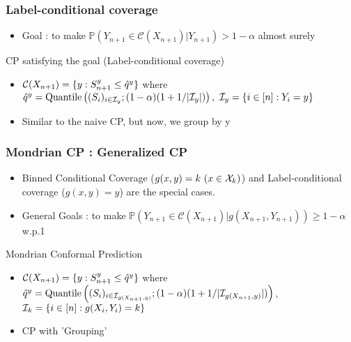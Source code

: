 \documentclass[compress]{beamer}
\begin{document}
\begin{frame}\frametitle{Label-conditional coverage}
	\begin{itemize}
		\item Goal : to make $\mathbb{P}(Y_{n+1}\in \mathcal{C}(X_{n+1})|Y_{n+1}) > 1-\alpha$ almost surely
	\end{itemize}
	\begin{alertblock}{CP satisfying the goal (Label-conditional coverage)}
		\begin{itemize}
			\item $\mathcal{C}(X_{n+1}) = \{y : S_{n+1}^y \le \hat{q}^y\}$ where $\hat{q}^y = \quantile\left((S_i)_{i\in{\cI_y}} ; (1-\alpha)(1+1/|\cI_y|)\right),\ \cI_y = \{i\in[n]:Y_i = y\}$
			\item Similar to the naive CP, but now, we group by y
		\end{itemize}
	\end{alertblock}
\end{frame}

\begin{frame}\frametitle{Mondrian CP : Generalized CP}
	\begin{itemize}
		\item Binned Conditional Coverage ($g(x, y) = k~(x\in\mathcal{X}_k)$) and Label-conditional coverage ($g(x, y) = y$) are the special cases.
		\item General Goals : to make $\mathbb{P}(Y_{n+1}\in \mathcal{C}(X_{n+1})|g(X_{n+1}, Y_{n+1})) \ge 1-\alpha$ w.p.1
	\end{itemize}
	\begin{alertblock}{Mondrian Conformal Prediction}
		\begin{itemize}
			\item $\mathcal{C}(X_{n+1}) = \{y : S_{n+1}^y \le \hat{q}^y\}$ where $\hat{q}^y = \mathrm{Quantile}\left((S_i)_{i\in{\mathcal{I}_{g(X_{n+1}, y)}}} ; (1-\alpha)(1+1/|\mathcal{I}_{g(X_{n+1}, y)}|)\right)$, $\mathcal{I}_k = \{i\in[n]:g(X_i, Y_i) = k\}$
			\item CP with 'Grouping'
		\end{itemize}
	\end{alertblock}
\end{frame}
\end{document}
